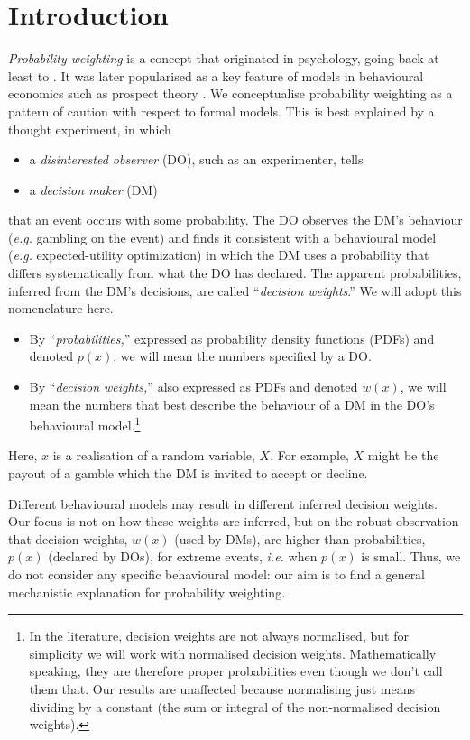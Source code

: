 \documentclass[a4paper, 12pt]{article}
\newcommand{\bi}{\begin{itemize}}
\newcommand{\ei}{\end{itemize}}
\newcommand{\ie}{\textit{i.e.}\xspace}
\newcommand{\eg}{\textit{e.g.}\xspace}
\begin{document}
\section{Introduction}
\textit{Probability weighting} is a concept that originated in psychology, going back at least to \textcite{PrestonBaratta1948}.
It was later popularised as a key feature of models in behavioural economics such as prospect theory \parencite{KahnemanTversky1979,TverskyKahneman1992}.
We conceptualise probability weighting as a pattern of caution with respect to formal models.
This is best explained by a thought experiment, in which  
\bi
	\item a \textit{disinterested observer} (DO), such as an experimenter, tells
	\item a \textit{decision maker} (DM)
\ei
that an event occurs with some probability. The DO observes the DM's behaviour (\eg gambling on the event) and finds it consistent with a behavioural model (\eg expected-utility optimization) in which the DM uses a probability that differs systematically from what the DO has declared. The apparent probabilities, inferred from the DM's decisions, are called ``\textit{decision weights}.'' We will adopt this nomenclature here.
% 
\bi
	\item By ``\textit{probabilities,}'' expressed as probability density functions (PDFs) and denoted $p(x)$, we will mean the numbers specified by a DO.
	\item By ``\textit{decision weights,}'' also expressed as PDFs and denoted $w(x)$, we will mean the numbers that best describe the behaviour of a DM in the DO's behavioural model.\footnote{In the literature, decision weights are not always normalised, but for simplicity we will work with normalised decision weights. Mathematically speaking, they are therefore proper probabilities even though we don't call them that. Our results are unaffected because normalising just means dividing by a constant (the sum or integral of the non-normalised decision weights).}
\ei
Here, $x$ is a realisation of a random variable, $X$. For example, $X$ might be the payout of a gamble which the DM is invited to accept or decline.

Different behavioural models may result in different inferred decision weights. Our focus is not on how these weights are inferred, but on the robust observation that decision weights, $w(x)$ (used by DMs), are higher than probabilities, $p(x)$ (declared by DOs), for extreme events, \ie when $p(x)$ is small. Thus, we do not consider any specific behavioural model: our aim is to find a general mechanistic explanation for probability weighting.
\end{document}
